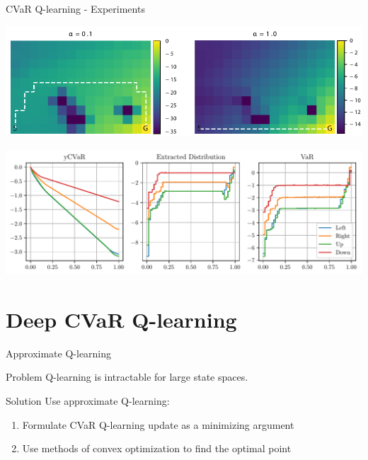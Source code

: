 \documentclass{beamer}
\begin{document}

\begin{frame}{CVaR Q-learning - Experiments}

\center
\includegraphics[width=0.9\linewidth]{gfx/q_optimal_paths.pdf}

\includegraphics[width=0.8\linewidth]{../gfx/nonconvex.pdf}
\end{frame}

%
%


\section{Deep CVaR Q-learning}



\begin{frame}{Approximate Q-learning}
\begin{alertblock}
{Problem} Q-learning is intractable for large state spaces.
\end{alertblock}
\begin{exampleblock}
{Solution} Use approximate Q-learning:
\begin{enumerate}
\item Formulate CVaR Q-learning update as a minimizing argument
\item Use methods of convex optimization to find the optimal point
\end{enumerate}
\end{exampleblock}

\end{frame}
\end{document}
